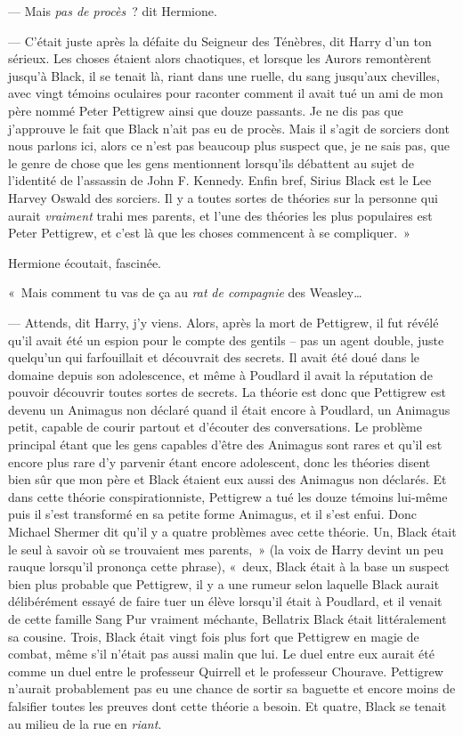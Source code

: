 --- Mais \emph{pas de procès}~? dit Hermione.

--- C'était juste après la défaite du Seigneur des Ténèbres, dit Harry d'un ton sérieux.
Les choses étaient alors chaotiques, et lorsque les Aurors remontèrent jusqu'à Black, il se tenait là, riant dans une ruelle, du sang jusqu'aux chevilles, avec vingt témoins oculaires pour raconter comment il avait tué un ami de mon père nommé Peter Pettigrew ainsi que douze passants.
Je ne dis pas que j'approuve le fait que Black n'ait pas eu de procès.
Mais il s'agit de sorciers dont nous parlons ici, alors ce n'est pas beaucoup plus suspect que, je ne sais pas, que le genre de chose que les gens mentionnent lorsqu'ils débattent au sujet de l'identité de l'assassin de John F.
Kennedy.
Enfin bref, Sirius Black est le Lee Harvey Oswald des sorciers.
Il y a toutes sortes de théories sur la personne qui aurait \emph{vraiment} trahi mes parents, et l'une des théories les plus populaires est Peter Pettigrew, et c'est là que les choses commencent à se compliquer.~»

Hermione écoutait, fascinée.

«~Mais comment tu vas de ça au \emph{rat} \emph{de compagnie} des Weasley…

--- Attends, dit Harry, j'y viens.
Alors, après la mort de Pettigrew, il fut révélé qu'il avait été un espion pour le compte des gentils -- pas un agent double, juste quelqu'un qui farfouillait et découvrait des secrets.
Il avait été doué dans le domaine depuis son adolescence, et même à Poudlard il avait la réputation de pouvoir découvrir toutes sortes de secrets.
La théorie est donc que Pettigrew est devenu un Animagus non déclaré quand il était encore à Poudlard, un Animagus petit, capable de courir partout et d'écouter des conversations.
Le problème principal étant que les gens capables d'être des Animagus sont rares et qu'il est encore plus rare d'y parvenir étant encore adolescent, donc les théories disent bien sûr que mon père et Black étaient eux aussi des Animagus non déclarés.
Et dans cette théorie conspirationniste, Pettigrew a tué les douze témoins lui-même puis il s'est transformé en sa petite forme Animagus, et il s'est enfui.
Donc Michael Shermer dit qu'il y a quatre problèmes avec cette théorie.
Un, Black était le seul à savoir où se trouvaient mes parents,~» (la voix de Harry devint un peu rauque lorsqu'il prononça cette phrase), «~deux, Black était à la base un suspect bien plus probable que Pettigrew, il y a une rumeur selon laquelle Black aurait délibérément essayé de faire tuer un élève lorsqu'il était à Poudlard, et il venait de cette famille Sang Pur vraiment méchante, Bellatrix Black était littéralement sa cousine.
Trois, Black était vingt fois plus fort que Pettigrew en magie de combat, même s'il n'était pas aussi malin que lui.
Le duel entre eux aurait été comme un duel entre le professeur Quirrell et le professeur Chourave.
Pettigrew n'aurait probablement pas eu une chance de sortir sa baguette et encore moins de falsifier toutes les preuves dont cette théorie a besoin.
Et quatre, Black se tenait au milieu de la rue en \emph{riant}.

